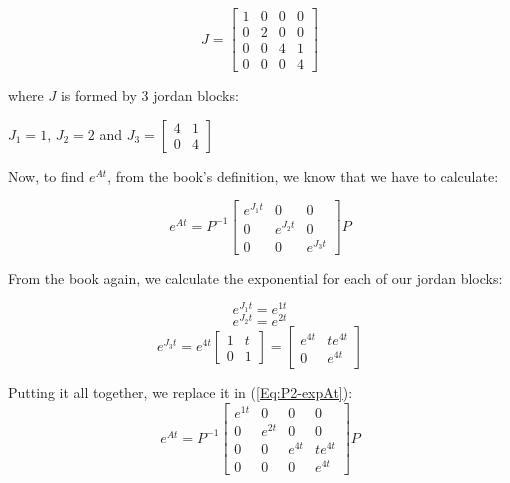 \documentclass[10pt,a4paper]{article}
\begin{document}
\[ J = 
\begin{bmatrix}
   1 &  0 &  0 &  0 \\
   0 &  2 &  0 &  0 \\
   0 &  0 &  4 &  1 \\
   0 &  0 &  0 &  4
\end{bmatrix}
\]

where $J$ is formed by $3$ jordan blocks:

\begin{center}
$J_{1} = 1$, $J_{2} = 2$ and $J_{3} = \begin{bmatrix}4 & 1 \\ 0 & 4\end{bmatrix}$ 
\end{center}

Now, to find $e^{At}$, from the book's definition, we know that we have to calculate:

\begin{equation}
e^{At} = P^{-1}
\begin{bmatrix}
e^{J_{1}t} & 0 & 0 \\
0 & e^{J_{2}t} & 0 \\
0 & 0 & e^{J_{3}t}  
\end{bmatrix}
P
\label{Eq:P2-expAt}
\end{equation}

From the book again, we calculate the exponential for each of our jordan blocks:

\[ e^{J_{1}t} = e^{1t} \]
\[ e^{J_{2}t} = e^{2t} \]
\[ e^{J_{3}t} = 
e^{4t}
\begin{bmatrix}1 & t \\ 0 & 1\end{bmatrix}
=
\begin{bmatrix}e^{4t} & te^{4t} \\ 0 & e^{4t}\end{bmatrix}
\] 

Putting it all together, we replace it in (\ref{Eq:P2-expAt}):
\[
e^{At} = P^{-1}
\begin{bmatrix}
e^{1t} & 0 & 0 & 0 \\
0 & e^{2t} & 0 & 0 \\
0 & 0 & e^{4t} & te^{4t} \\
0 & 0 & 0 & e^{4t}  
\end{bmatrix}
P
\]
\end{document}

